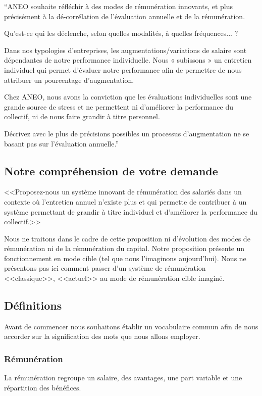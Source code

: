 \documentclass[12pt]{article}
\begin{document}
 “ANEO souhaite réfléchir à des modes de rémunération innovants, et plus précisément à la dé-corrélation de l’évaluation annuelle et de la rémunération.
 
 Qu’est-ce qui les déclenche, selon quelles modalités, à quelles fréquences... ?
 
 Dans nos typologies d’entreprises, les augmentations/variations de salaire sont dépendantes de notre performance individuelle. Nous « subissons » un entretien individuel qui permet d’évaluer notre performance afin de permettre de nous attribuer un pourcentage d’augmentation. 
 
 Chez ANEO, nous avons la conviction que les évaluations individuelles sont une grande source de stress et ne permettent ni d’améliorer la performance du collectif, ni de nous faire grandir à titre personnel.
 
 Décrivez avec le plus de précisions possibles un processus d’augmentation ne se basant pas sur l’évaluation annuelle.”

\subsection{Notre compréhension de votre demande}
 <<Proposez-nous un système innovant de rémunération des salariés dans un contexte où l’entretien annuel n’existe plus et qui permette de contribuer à un système permettant de grandir à titre individuel et d’améliorer la performance du collectif.>>

 Nous ne traitons dans le cadre de cette proposition ni d’évolution des modes de rémunération ni de la rémunération du capital. Notre proposition présente un fonctionnement en mode cible (tel que nous l’imaginons aujourd’hui). Nous ne présentons pas ici comment passer d’un système de rémunération <<classique>>, <<actuel>> au mode de rémunération cible imaginé.  

\subsection{Définitions}
 Avant de commencer nous souhaitons établir un vocabulaire commun afin de nous accorder sur la signification des mots que nous allons employer.

\subsubsection{Rémunération} 
 La rémunération regroupe un salaire, des avantages, une part variable et une répartition des bénéfices.
\end{document}
